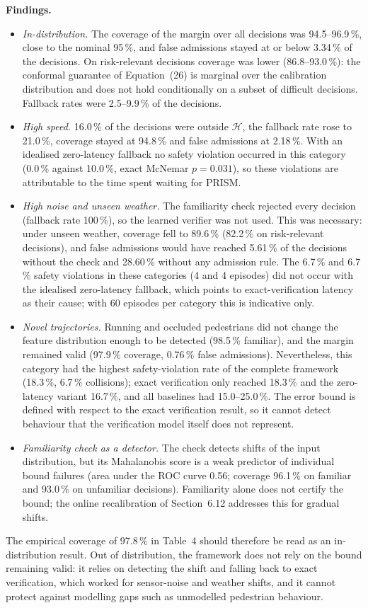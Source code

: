 \documentclass[11pt]{article}
\begin{document}
\textbf{Findings.}
\begin{itemize}[leftmargin=1.3em,itemsep=2pt]
\item \emph{In-distribution.} The coverage of the margin over all decisions was 94.5--96.9\,\%, close to the nominal 95\,\%, and false admissions stayed at or below 3.34\,\% of the decisions. On risk-relevant decisions coverage was lower (86.8--93.0\,\%): the conformal guarantee of Equation~(26) is marginal over the calibration distribution and does not hold conditionally on a subset of difficult decisions. Fallback rates were 2.5--9.9\,\% of the decisions.
\item \emph{High speed.} 16.0\,\% of the decisions were outside $\mathcal{H}$, the fallback rate rose to 21.0\,\%, coverage stayed at 94.8\,\% and false admissions at 2.18\,\%. With an idealised zero-latency fallback no safety violation occurred in this category (0.0\,\% against 10.0\,\%, exact McNemar $p=0.031$), so these violations are attributable to the time spent waiting for PRISM.
\item \emph{High noise and unseen weather.} The familiarity check rejected every decision (fallback rate 100\,\%), so the learned verifier was not used. This was necessary: under unseen weather, coverage fell to 89.6\,\% (82.2\,\% on risk-relevant decisions), and false admissions would have reached 5.61\,\% of the decisions without the check and 28.60\,\% without any admission rule. The 6.7\,\% and 6.7\,\% safety violations in these categories (4 and 4 episodes) did not occur with the idealised zero-latency fallback, which points to exact-verification latency as their cause; with 60 episodes per category this is indicative only.
\item \emph{Novel trajectories.} Running and occluded pedestrians did not change the feature distribution enough to be detected (98.5\,\% familiar), and the margin remained valid (97.9\,\% coverage, 0.76\,\% false admissions). Nevertheless, this category had the highest safety-violation rate of the complete framework (18.3\,\%, 6.7\,\% collisions); exact verification only reached 18.3\,\% and the zero-latency variant 16.7\,\%, and all baselines had 15.0--25.0\,\%. The error bound is defined with respect to the exact verification result, so it cannot detect behaviour that the verification model itself does not represent.
\item \emph{Familiarity check as a detector.} The check detects shifts of the input distribution, but its Mahalanobis score is a weak predictor of individual bound failures (area under the ROC curve 0.56; coverage 96.1\,\% on familiar and 93.0\,\% on unfamiliar decisions). Familiarity alone does not certify the bound; the online recalibration of Section~6.12 addresses this for gradual shifts.
\end{itemize}
The empirical coverage of 97.8\,\% in Table~4 should therefore be read as an in-distribution result. Out of distribution, the framework does not rely on the bound remaining valid: it relies on detecting the shift and falling back to exact verification, which worked for sensor-noise and weather shifts, and it cannot protect against modelling gaps such as unmodelled pedestrian behaviour.
\end{document}
